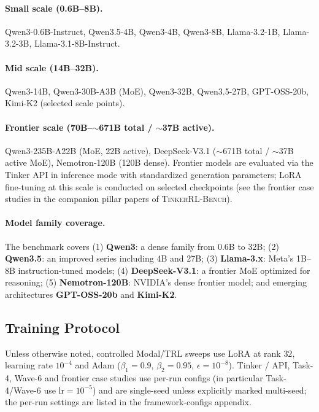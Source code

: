 \documentclass{article}  \usepackage[preprint,nonatbib]{neurips_2026} \usepackage[numbers]{natbib}
\newcommand{\ours}{\textsc{TinkerRL-Bench}}
\begin{document}
\paragraph{Small scale (0.6B--8B).}
Qwen3-0.6B-Instruct, Qwen3.5-4B, Qwen3-4B, Qwen3-8B,
Llama-3.2-1B, Llama-3.2-3B, Llama-3.1-8B-Instruct.

\paragraph{Mid scale (14B--32B).}
Qwen3-14B, Qwen3-30B-A3B (MoE), Qwen3-32B, Qwen3.5-27B,
GPT-OSS-20b, Kimi-K2 (selected scale points).

\paragraph{Frontier scale (70B--$\sim$671B total / $\sim$37B active).}
Qwen3-235B-A22B (MoE, 22B active), DeepSeek-V3.1 ($\sim$671B total /
$\sim$37B active MoE), Nemotron-120B (120B dense).
Frontier models are evaluated via the Tinker API in inference mode
with standardized generation parameters; LoRA fine-tuning at this
scale is conducted on selected checkpoints (see the frontier case studies
in the companion pillar papers of \ours{}).

\paragraph{Model family coverage.}
The benchmark covers (1) \textbf{Qwen3}: a dense family from 0.6B to 32B;
(2) \textbf{Qwen3.5}: an improved series including 4B and 27B;
(3) \textbf{Llama-3.x}: Meta's 1B--8B instruction-tuned models;
(4) \textbf{DeepSeek-V3.1}: a frontier MoE optimized for reasoning;
(5) \textbf{Nemotron-120B}: NVIDIA's dense frontier model;
and emerging architectures \textbf{GPT-OSS-20b} and \textbf{Kimi-K2}.

\subsection{Training Protocol}

Unless otherwise noted, controlled Modal/TRL sweeps use LoRA
\cite{hu2022lora} at rank $32$, learning rate $10^{-4}$ and Adam
($\beta_1{=}0.9$, $\beta_2{=}0.95$, $\epsilon{=}10^{-8}$). Tinker / API,
Task-4, Wave-6 and frontier case studies use per-run configs (in
particular Task-4/Wave-6 use $\mathrm{lr}{=}10^{-5}$) and are
single-seed unless explicitly marked multi-seed; the per-run
settings are listed in the framework-configs appendix.
\end{document}
